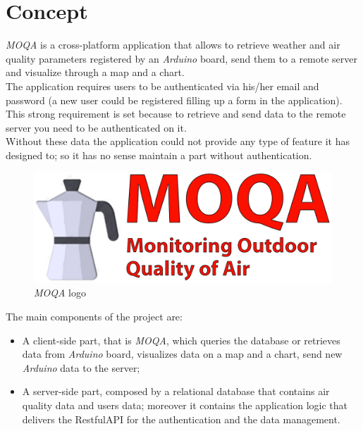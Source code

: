 \section{Concept}
\textit{MOQA} is a cross-platform application that allows to retrieve weather and air quality parameters registered by an \textit{Arduino} board, send them to a remote server and visualize through a map and a chart.\\

The application requires users to be authenticated via his/her email and password (a new user could be registered filling up a form in the application).\\
This strong requirement is set because to retrieve and send data to the remote server you need to be authenticated on it. \\ 
Without these data the application could not provide any type of feature it has designed to; so it has no sense maintain a part without authentication.\\

\begin{figure}[h]
\begin{center}
  \includegraphics{img/logo_moqa.png}
  \hspace{0.05\linewidth}
  \centering
  \caption{\textit{MOQA} logo}
  \label{img:logo_moqa}
\end{center}
\end{figure}
\clearpage

The main components of the project are:
\begin{itemize}
    \item A client-side part, that is \textit{MOQA}, which queries the database or retrieves data from \textit{Arduino} board, visualizes data on a map and a chart, send new \textit{Arduino} data to the server;
    \item A server-side part, composed by a relational database that contains air quality data and users data; moreover it contains the application logic that delivers the RestfulAPI for the authentication and the data management.
\end{itemize}


